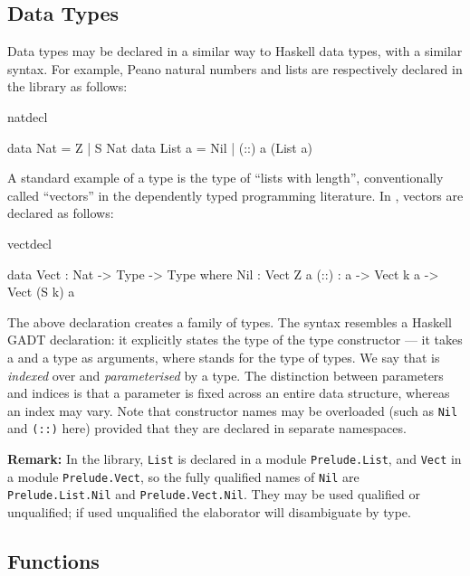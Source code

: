 \subsection{Data Types}

Data types may be declared in a similar way to Haskell data types, with a
similar syntax. For example, Peano natural numbers and lists
are respectively declared in the library as follows:

\begin{SaveVerbatim}{natdecl}

data Nat    = Z   | S Nat 
data List a = Nil | (::) a (List a)

\end{SaveVerbatim}

\noindent
A standard example of a  type is the type of ``lists with
length'', conventionally called ``vectors'' in the dependently typed
programming literature. In \Idris{}, vectors are declared as follows:

\begin{SaveVerbatim}{vectdecl}

data Vect : Nat -> Type -> Type where
   Nil  : Vect Z a
   (::) : a -> Vect k a -> Vect (S k) a

\end{SaveVerbatim}

\noindent
The above declaration creates a family of types. The syntax resembles a Haskell
GADT declaration: it explicitly states the type
of the type constructor  --- it takes a  and a type as
arguments, where  stands for the type of types. We say that 
is \emph{indexed} over  and \emph{parameterised} by a type. 
The distinction between parameters and indices is that a parameter is fixed
across an entire data structure, whereas an index may vary.
Note that constructor names may be overloaded (such as \texttt{Nil} and
\texttt{(::)} here) provided that they are declared in separate 
namespaces.

\textbf{Remark:} In the library, \texttt{List} is declared in a module
\texttt{Prelude.List}, and \texttt{Vect} in a module \texttt{Prelude.Vect}, so
the fully qualified names of \texttt{Nil} are \texttt{Prelude.List.Nil} and
\texttt{Prelude.Vect.Nil}. They may be used qualified or unqualified; if
used unqualified the elaborator will disambiguate by type.

\subsection{Functions}

